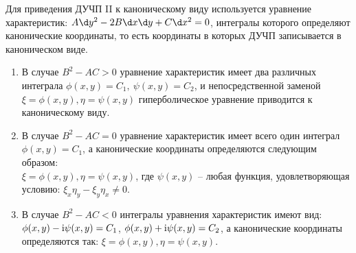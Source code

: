 \vspace*{.6em}
Для приведения ДУЧП II к каноническому виду используется уравнение
характеристик: \( A\d y^2 - 2B\d x\d y + C\d x^2 = 0 \), интегралы которого
определяют канонические координаты, то есть координаты в которых ДУЧП
записывается в каноническом виде.
\begin{enumerate}
    \item В случае \( B^2 - AC > 0 \) уравнение характеристик имеет два
    различных интеграла \( \phi(x, y) = C_1,\ \psi(x, y) = C_2 \), и
    непосредственной заменой \( \xi =\phi(x, y), \eta = \psi(x, y) \)
    гиперболическое уравнение приводится к каноническому виду.

    \item В случае \( B^2 - AC = 0 \) уравнение характеристик имеет всего один
    интеграл\\
    \( \phi(x, y) = C_1 \), а канонические координаты определяются
    следующим образом:\\
    \( \xi =\phi(x, y), \eta = \psi(x, y) \), где
    \( \psi(x, y) \) -- любая функция, удовлетворяющая условию: \( \xi_x\eta_y -
    \xi_y\eta_x \ne 0 \).
    
    \item В случае \( B^2 - AC < 0 \) интегралы уравнения характеристик имеют
    вид:\\
    \( \phi(x, y)- \mathrm{i}\psi(x, y) = C_1 \), \( \phi(x, y) + \mathrm{i}\psi(x, y) =
    C_2 \), а канонические координаты определяются так: \( \xi =\phi(x, y),
    \eta = \psi(x, y) \).
\end{enumerate}

\newpage
